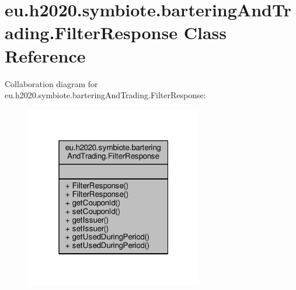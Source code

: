 \hypertarget{classeu_1_1h2020_1_1symbiote_1_1barteringAndTrading_1_1FilterResponse}{}\section{eu.\+h2020.\+symbiote.\+bartering\+And\+Trading.\+Filter\+Response Class Reference}
\label{classeu_1_1h2020_1_1symbiote_1_1barteringAndTrading_1_1FilterResponse}


Collaboration diagram for eu.\+h2020.\+symbiote.\+bartering\+And\+Trading.\+Filter\+Response\+:\nopagebreak
\begin{figure}[H]
\begin{center}
\leavevmode
\includegraphics[width=220pt]{classeu_1_1h2020_1_1symbiote_1_1barteringAndTrading_1_1FilterResponse__coll__graph}
\end{center}
\end{figure}

